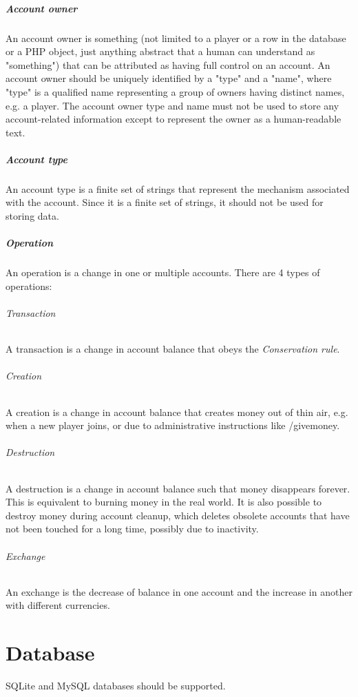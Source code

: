 \documentclass{report}
\begin{document}
			\paragraph{Account owner}
				An account owner is something (not limited to a player or a row in the database or a PHP object,
				just anything abstract that a human can understand as "something") that can be attributed as having full control on an account.
				An account owner should be uniquely identified by a "type" and a "name",
				where "type" is a qualified name representing a group of owners having distinct names, e.g. a player.
				The account owner type and name must not be used to store any account-related information except to represent the owner as a human-readable text.

			\paragraph{Account type}
				An account type is a finite set of strings that represent the mechanism associated with the account.
				Since it is a finite set of strings, it should not be used for storing data.

			\paragraph{Operation}
				An operation is a change in one or multiple accounts.
				There are 4 types of operations:
				\subparagraph{Transaction} A transaction is a change in account balance that obeys the \textit{Conservation rule}.
				\subparagraph{Creation} A creation is a change in account balance that creates money out of thin air,
					e.g. when a new player joins, or due to administrative instructions like /givemoney.
				\subparagraph{Destruction} A destruction is a change in account balance such that money disappears forever.
					This is equivalent to burning money in the real world.
					It is also possible to destroy money during account cleanup, which
					deletes obsolete accounts that have not been touched for a long time, possibly due to inactivity.
				\subparagraph{Exchange} An exchange is the decrease of balance in one account and the increase in another with different currencies.

		\chapter{Database}

			SQLite and MySQL databases should be supported.
\end{document}
